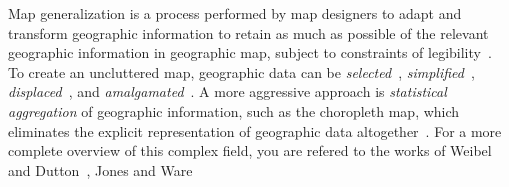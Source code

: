\documentclass[11pt, oneside]{report}
\begin{document}


Map generalization is a process performed by map designers to adapt and transform geographic information to retain as much as possible of the relevant geographic information in geographic map, subject to constraints of legibility~\cite{weibel1999generalising}. To create an uncluttered map, geographic data can be \emph{selected}~\cite{sarma2012fusiontables}, \emph{simplified}~\cite{douglas1973algorithms},  \emph{displaced}~\cite{lonergan2001iterative}, and \emph{amalgamated}~\cite{haunert2006landcover}. A more aggressive approach is \emph{statistical aggregation} of geographic information, such as the choropleth map, which eliminates the explicit representation of geographic data altogether~\cite{friendly2008milestones}. For a more complete overview of this complex field, you are refered to the works of Weibel and Dutton~\cite{weibel1999generalising}, Jones and Ware~\cite{jones2005webage}
\end{document}
